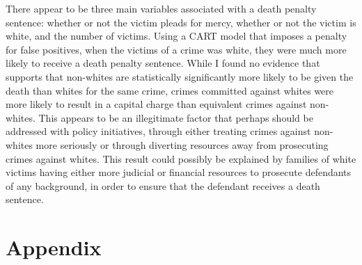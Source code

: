 \documentclass{article}
\begin{document}
There appear to be three main variables associated with a death penalty sentence: whether or not the victim pleads for mercy, whether or not the victim is white, and the number of victims. Using a CART model that imposes a penalty for false positives, when the victims of a crime was white, they were much more likely to receive a death penalty sentence. 
While I found no evidence that supports that non-whites are statistically significantly more likely to be given the death than whites for the same crime, crimes committed against whites were more likely to result in a capital charge than equivalent crimes against non-whites. This appears to be an illegitimate factor that perhaps should be addressed with policy initiatives, through either treating crimes against non-whites more seriously or through diverting resources away from prosecuting crimes against whites. This result could possibly be explained by families of white victims having either more judicial or financial resources to prosecute defendants of any background, in order to ensure that the defendant receives a death sentence. 




\section{Appendix}
\end{document}
